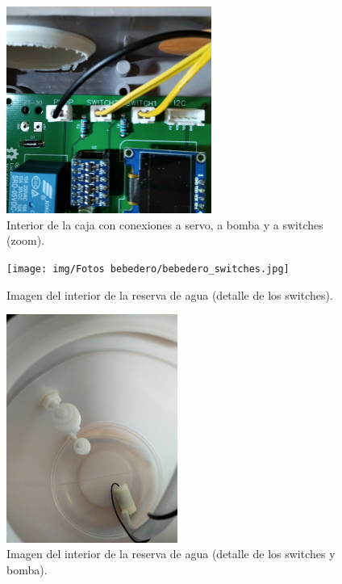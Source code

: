 \documentclass[12pt]{article}
\begin{document}
	\begin{figure}[h]
		\begin{center}
			\includegraphics[width=0.6\textwidth]{img/Fotos bebedero/caja_bomba_conexion_zoom.jpg}
			\caption{Interior de la caja con conexiones a servo, a bomba y a switches (zoom).}
			\label{Prototipo: bebedero conexiones (zoom)}
		\end{center}
	\end{figure}

	\pagebreak
	
	\begin{figure}[h]
		\begin{center}
			\texttt{[image: img/Fotos bebedero/bebedero\_switches.jpg]}
			\caption{Imagen del interior de la reserva de agua (detalle de los switches).}
			\label{Prototipo: reserva agua (detalle interior solo switches)}
		\end{center}
	\end{figure}
	
	\pagebreak
	
	\begin{figure}[h]
		\begin{center}
			\includegraphics[width=0.5\textwidth]{img/Fotos bebedero/bebedero_switches_bomba.jpg}
			\caption{Imagen del interior de la reserva de agua (detalle de los switches y bomba).}
			\label{Prototipo: reserva agua (detalle interior)}
		\end{center}
	\end{figure}
	
\end{document}
